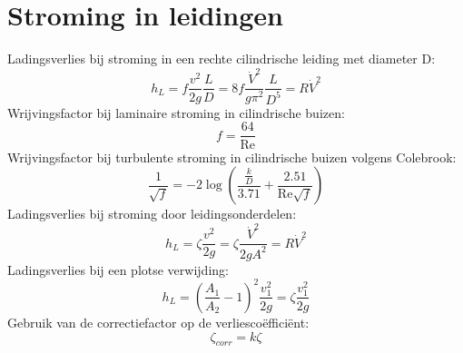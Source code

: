 	\section{Stroming in leidingen}
\begin{multicols}{2}
	Ladingsverlies bij stroming in een rechte cilindrische leiding met diameter D:
	\begin{equation}
		h_L = f \frac{v^2}{2 g}\frac{L}{D} = 8 f \frac{\dot{V}^2}{g \pi^2}\frac{L}{D^5} = R \dot{V}^2
	\end{equation}
	Wrijvingsfactor bij laminaire stroming in cilindrische buizen:
	\begin{equation}
		f = \frac{64}{\text{Re}}
	\end{equation}
	Wrijvingsfactor bij turbulente stroming in cilindrische buizen volgens Colebrook:
	\begin{equation}
		\frac{1}{\sqrt{f}} = -2 \log \left( \frac{\frac{k}{D}}{3.71}+\frac{2.51}{\text{Re}\sqrt{f}} \right)
	\end{equation}
	Ladingsverlies bij stroming door leidingsonderdelen:
	\begin{equation}
		h_L = \zeta \frac{v^2}{2 g} = \zeta \frac{\dot{V}^2}{2 g A^2} = R \dot{V}^2
	\end{equation}
	Ladingsverlies bij een plotse verwijding:
	\begin{equation}
		h_L = \left(\frac{A_1}{A_2}-1\right)^2 \frac{v_1^2}{2 g} = \zeta \frac{v_1^2}{2 g}
	\end{equation}
	Gebruik van de correctiefactor op de verliesco\"effici\"ent:
	\begin{equation}
		\zeta_{corr} = k \zeta
	\end{equation}
\end{multicols}